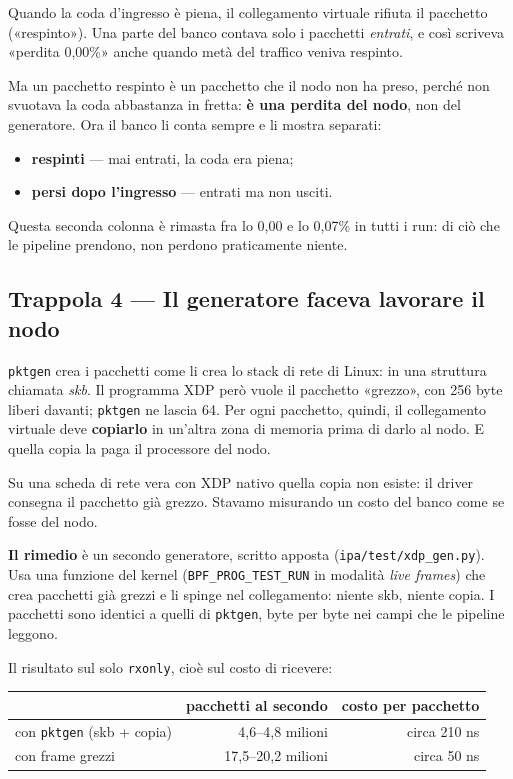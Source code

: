 \documentclass[11pt,a4paper,oneside]{report}
\begin{document}
Quando la coda d'ingresso è piena, il collegamento virtuale rifiuta il pacchetto
(«respinto»). Una parte del banco contava solo i pacchetti \emph{entrati}, e così
scriveva «perdita 0,00\%» anche quando metà del traffico veniva respinto.

Ma un pacchetto respinto è un pacchetto che il nodo non ha preso, perché non
svuotava la coda abbastanza in fretta: \textbf{è una perdita del nodo}, non del
generatore. Ora il banco li conta sempre e li mostra separati:
\begin{itemize}
  \item \textbf{respinti} --- mai entrati, la coda era piena;
  \item \textbf{persi dopo l'ingresso} --- entrati ma non usciti.
\end{itemize}
Questa seconda colonna è rimasta fra lo 0,00 e lo 0,07\% in tutti i run: di ciò
che le pipeline prendono, non perdono praticamente niente.

\subsection*{Trappola 4 --- Il generatore faceva lavorare il nodo}

\texttt{pktgen} crea i pacchetti come li crea lo stack di rete di Linux: in una
struttura chiamata \emph{skb}. Il programma XDP però vuole il pacchetto
«grezzo», con 256 byte liberi davanti; \texttt{pktgen} ne lascia 64. Per ogni
pacchetto, quindi, il collegamento virtuale deve \textbf{copiarlo} in un'altra
zona di memoria prima di darlo al nodo. E quella copia la paga il processore
del nodo.

Su una scheda di rete vera con XDP nativo quella copia non esiste: il driver
consegna il pacchetto già grezzo. Stavamo misurando un costo del banco come se
fosse del nodo.

\textbf{Il rimedio} è un secondo generatore, scritto apposta
(\texttt{ipa/test/xdp\_gen.py}). Usa una funzione del kernel
(\texttt{BPF\_PROG\_TEST\_RUN} in modalità \emph{live frames}) che crea pacchetti
già grezzi e li spinge nel collegamento: niente skb, niente copia. I pacchetti
sono identici a quelli di \texttt{pktgen}, byte per byte nei campi che le
pipeline leggono.

Il risultato sul solo \texttt{rxonly}, cioè sul costo di ricevere:

\begin{center}
\small
\begin{tabular}{@{}lrr@{}}
\toprule
& \textbf{pacchetti al secondo} & \textbf{costo per pacchetto} \\
\midrule
con \texttt{pktgen} (skb + copia) & 4,6--4,8 milioni & circa 210 ns \\
con frame grezzi                 & 17,5--20,2 milioni & circa 50 ns \\
\bottomrule
\end{tabular}
\end{center}
\end{document}
